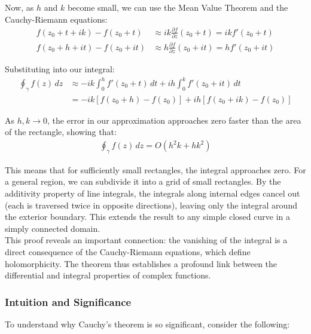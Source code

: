 \noindent Now, as $h$ and $k$ become small, we can use the Mean Value Theorem and the Cauchy-Riemann equations:
\begin{align*}
f(z_0 + t + ik) - f(z_0 + t) &\approx ik \frac{\partial f}{\partial z}(z_0 + t) = ik f'(z_0 + t) \\
f(z_0 + h + it) - f(z_0 + it) &\approx h \frac{\partial f}{\partial z}(z_0 + it) = h f'(z_0 + it)
\end{align*}

\noindent Substituting into our integral:
\begin{align*}
\oint_{\gamma} f(z) \, dz &\approx -ik \int_0^h f'(z_0 + t) \, dt + ih \int_0^k f'(z_0 + it) \, dt \\
&= -ik [f(z_0 + h) - f(z_0)] + ih [f(z_0 + ik) - f(z_0)]
\end{align*}

\noindent As $h, k \to 0$, the error in our approximation approaches zero faster than the area of the rectangle, showing that:
\begin{align*}
\oint_{\gamma} f(z) \, dz = O(h^2 k + hk^2)
\end{align*}

\noindent This means that for sufficiently small rectangles, the integral approaches zero. For a general region, we can subdivide it into a grid of small rectangles. By the additivity property of line integrals, the integrals along internal edges cancel out (each is traversed twice in opposite directions), leaving only the integral around the exterior boundary. This extends the result to any simple closed curve in a simply connected domain. \\

\noindent This proof reveals an important connection: the vanishing of the integral is a direct consequence of the Cauchy-Riemann equations, which define holomorphicity. The theorem thus establishes a profound link between the differential and integral properties of complex functions.

\subsubsection*{Intuition and Significance}

\noindent To understand why Cauchy's theorem is so significant, consider the following:

